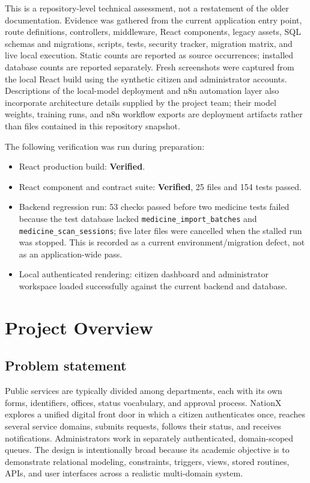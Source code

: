 \documentclass[12pt,a4paper,oneside]{report}
\newcommand{\statusgood}{\textcolor{nationgreen}{\textbf{Verified}}}
\newcommand{\code}[1]{\texttt{#1}}
\begin{document}
This is a repository-level technical assessment, not a restatement of the older documentation.
Evidence was gathered from the current application entry point, route definitions, controllers,
middleware, React components, legacy assets, SQL schemas and migrations, scripts, tests, security
tracker, migration matrix, and live local execution. Static counts are reported as source
occurrences; installed database counts are reported separately. Fresh screenshots were captured
from the local React build using the synthetic citizen and administrator accounts.
Descriptions of the local-model deployment and n8n automation layer also incorporate architecture
details supplied by the project team; their model weights, training runs, and n8n workflow exports
are deployment artifacts rather than files contained in this repository snapshot.

The following verification was run during preparation:

\begin{itemize}
  \item React production build: \statusgood.
  \item React component and contract suite: \statusgood, 25 files and 154 tests passed.
  \item Backend regression run: 53 checks passed before two medicine tests failed because the
        test database lacked \code{medicine\_import\_batches} and
        \code{medicine\_scan\_sessions}; five later files were cancelled when the stalled run was
        stopped. This is recorded as a current environment/migration defect, not as an application-wide pass.
  \item Local authenticated rendering: citizen dashboard and administrator workspace loaded
        successfully against the current backend and database.
\end{itemize}

\tableofcontents
\listoffigures
\listoftables
\clearpage
{}

\chapter{Project Overview}

\section{Problem statement}

Public services are typically divided among departments, each with its own forms, identifiers,
offices, status vocabulary, and approval process. NationX explores a unified digital front door in
which a citizen authenticates once, reaches several service domains, submits requests, follows
their status, and receives notifications. Administrators work in separately authenticated,
domain-scoped queues. The design is intentionally broad because its academic objective is to
demonstrate relational modeling, constraints, triggers, views, stored routines, APIs, and user
interfaces across a realistic multi-domain system.
\end{document}

